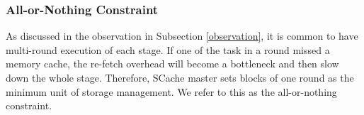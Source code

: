 \subsubsection{All-or-Nothing Constraint}
{\color{blue}
As discussed in the observation in Subsection \ref{observation}, it is common to have multi-round execution of each stage. 
If one of the task in a round missed a memory cache, the re-fetch overhead will become a bottleneck and then slow down the whole stage. 
}
Therefore, SCache master sets blocks of one round as the minimum unit of storage management.
We refer to this as the all-or-nothing constraint.

